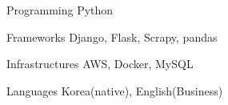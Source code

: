 

\begin{cvskills}

  \cvskill
    {Programming} %
    {Python} %

  \cvskill
    {Frameworks} %
    {Django, Flask, Scrapy, pandas} %

  \cvskill
    {Infrastructures} %
    {AWS, Docker, MySQL} %

  \cvskill
    {Languages} %
    {Korea(native), English(Business)} %

\end{cvskills}
